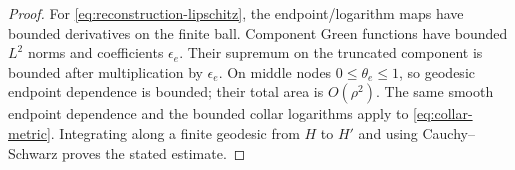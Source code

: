 \begin{proof}
For \eqref{eq:reconstruction-lipschitz}, the endpoint/logarithm
maps have bounded derivatives on the finite ball. Component Green
functions have bounded $L^2$ norms and coefficients $\epsilon_e$.
Their supremum on the truncated component is bounded after
multiplication by $\epsilon_e$. On middle nodes
$0\le\theta_e\le1$, so geodesic endpoint dependence is bounded;
their total area is $O(\rho^2)$. The same smooth endpoint
dependence and the bounded collar logarithms apply to
\eqref{eq:collar-metric}. Integrating along a finite geodesic from
$H$ to $H'$ and using Cauchy--Schwarz proves the stated estimate.
\end{proof}
